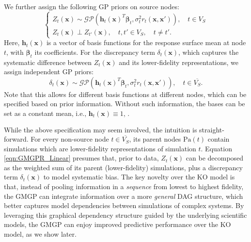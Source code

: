 \documentclass[12pt]{article}
\newcommand{\bs}[1]{\boldsymbol{#1}}
\newcommand{\cbl}[1]{{\color{black}{#1}}}
\newcommand{\cmtI}[1]{{\color{magenta} (Irene: #1)}}
\newcommand{\cmtS}[1]{{\color{blue} (Simon: #1)}}
\begin{document}
We further assign the following GP priors on source nodes:
\begin{equation}
    \begin{cases}
        Z_t(\bs{x})\sim \mathcal{GP}(\bs{h}_t(\bs{x})^T\bs{\beta}_t,\sigma_t^2r_t(\bs{x},\bs{x'})),\quad t\in {V}_S\\
        Z_t(\bs{x}) \perp Z_{t'}(\bs{x}),\quad t,t'\in {V}_S, \quad t \neq t'.
    \end{cases}
    \label{eq:GMGPR_prior}
\end{equation}
\noindent Here, $\bs{h}_t(\bs{x})$ is a vector of basis functions for the response surface mean at node $t$, with $\bs{\beta}_t$ its coefficients. For the discrepancy term $\delta_t(\mathbf{x})$, which captures the systematic difference between $Z_t(\mathbf{x})$ and its lower-fidelity representations, we assign independent GP priors:
\begin{equation}
\delta_t(\bs{x})\sim \mathcal{GP}(\bs{h}_t(\bs{x})^T\bs{\beta}_t,\sigma_t^2r_t(\bs{x},\bs{x'})), \quad t \in \overline{{V}_{S}}.
\label{eq:GMGPR_disc}
\end{equation}
Note that this allows for different basis functions at different nodes, which can be specified based on prior information. Without such information, the bases can be set as a constant mean, i.e., $\bs{h}_t(\bs{x}) \equiv 1$, \cbl{to avoid variance inflation}. \cbl{Here, the kernels at each node employ different length-scale parameters to allow for model flexibility.} 

While the above specification may seem involved, the intuition is straight-forward. For every non-source node $t \in \overline{{V}_{S}}$, its parent nodes $\text{Pa}(t)$ contain simulations which are lower-fidelity representations of simulation $t$. Equation \eqref{eqn:GMGPR_Linear} presumes that, prior to data, $Z_t(\bs{x})$ can be decomposed as the weighted sum of its parent (lower-fidelity) simulations, plus a discrepancy term $\delta_t(\bs{x})$ to model systematic bias. The key novelty over the KO model is that, instead of pooling information in a \textit{sequence} from lowest to highest fidelity, the GMGP can integrate information over a more \textit{general} DAG structure, which better captures model dependencies between simulations of complex systems. By leveraging this graphical dependency structure guided by the underlying scientific models, the GMGP can enjoy improved predictive performance over the KO model, as we show later.
\end{document}
